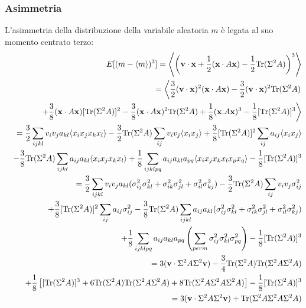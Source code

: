 \subsubsection{Asimmetria}
L'asimmetria della distribuzione della variabile aleatoria $m$ \`e legata al suo momento centrato terzo:
\begin{eqnarray*}
&&E[(m-\langle m\rangle)^3]=\left\langle\left({\bf v\cdot x}+\frac{1}{2}({\bf x}\cdot A{\bf x})-\frac{1}{2}{\rm Tr}(\Sigma^2 A)\right)^3\right\rangle\\&&=\left\langle\frac{3}{2}({\bf v\cdot x})^2({\bf x}\cdot A{\bf x})-\frac{3}{2}({\bf v\cdot x})^2{\rm Tr}(\Sigma^2 A)\right.\\
&&\left.+\frac{3}{8}({\bf x}\cdot A{\bf x})[{\rm Tr}(\Sigma^2 A)]^2-\frac{3}{8}({\bf x}\cdot A{\bf x})^2{\rm Tr}(\Sigma^2 A)+\frac{1}{8}({\bf x}.A{\bf x})^3-\frac{1}{8}[{\rm Tr}(\Sigma^2 A)]^3\right\rangle\\
&&=\frac{3}{2}\sum_{ijkl}v_iv_j a_{kl}\langle x_ix_jx_kx_l\rangle-\frac{3}{2}{\rm Tr}(\Sigma^2 A)\sum_{ij}v_iv_j\langle x_ix_j\rangle+\frac{3}{8}[{\rm Tr}(\Sigma^2 A)]^2\sum_{ij}a_{ij}\langle x_ix_j\rangle\\
&&-\frac{3}{8}{\rm Tr}(\Sigma^2 A)\sum_{ijkl}a_{ij}a_{kl}\langle x_ix_jx_kx_l\rangle+\frac{1}{8}\sum_{ijklpq}a_{ij}a_{kl}a_{pq}\langle x_ix_jx_kx_lx_px_q\rangle-\frac{1}{8}[{\rm Tr}(\Sigma^2 A)]^3\\
&&=\frac{3}{2}\sum_{ijkl}v_iv_ja_{kl}(\sigma^2_{ij}\sigma^2_{kl}+\sigma^2_{ik}\sigma^2_{jl}+\sigma^2_{il}\sigma^2_{kj})-\frac{3}{2}{\rm Tr}(\Sigma^2 A)\sum_{ij}v_iv_j\sigma^2_{ij}\\
&&+\frac{3}{8}[{\rm Tr}(\Sigma^2 A)]^2\sum_{ij}a_{ij}\sigma^2_{ij}-\frac{3}{8}{\rm Tr}(\Sigma^2 A)\sum_{ijkl}a_{ij}a_{kl}(\sigma^2_{ij}\sigma^2_{kl}+\sigma^2_{ik}\sigma^2_{jl}+\sigma^2_{il}\sigma^2_{kj})\\
&&+\frac{1}{8}\sum_{ijklpq}a_{ij}a_{kl}a_{pq}\left(\sum_{perm} \sigma^2_{ij}\sigma^2_{kl}\sigma^2_{pq}\right)-\frac{1}{8}[{\rm Tr}(\Sigma^2 A)]^3\\
&&=3({\bf v}\cdot\Sigma^2 A\Sigma^2{\bf v})-\frac{3}{4}{\rm Tr}(\Sigma^2 A){\rm Tr}(\Sigma^2 A\Sigma^2 A)\\
&&+\frac{1}{8}\left[[{\rm Tr}(\Sigma^2 A)]^3+6{\rm Tr}(\Sigma^2 A){\rm Tr}(\Sigma^2 A\Sigma^2 A)+8{\rm Tr}(\Sigma^2 A \Sigma^2 A \Sigma^2 A)\right]-\frac{1}{8}[{\rm Tr}(\Sigma^2 A)]^3\\
&&=3({\bf v}\cdot\Sigma^2 A\Sigma^2{\bf v})+{\rm Tr}(\Sigma^2 A \Sigma^2 A \Sigma^2 A)
\end{eqnarray*}
